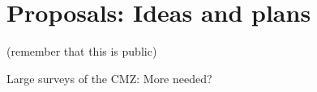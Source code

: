 \section{Proposals: Ideas and plans}
(remember that this is public)

Large surveys of the CMZ: More needed?